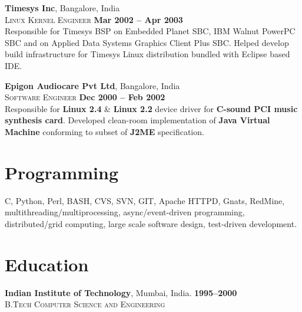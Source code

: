 \documentclass[margin,line]{resume}
\begin{document}
\begin{resume}
    \textbf{Timesys Inc}, Bangalore, India \\\vspace{1mm}%
    \textsc{Linux Kernel Engineer} \hfill \textbf{Mar 2002 -- Apr 2003}\\
    Responsible for Timesys BSP on Embedded Planet SBC, IBM Walnut
    PowerPC SBC and on Applied Data Systems Graphics Client Plus SBC.
    Helped develop build infrastructure for Timesys Linux distribution
    bundled with Eclipse based IDE.

    \textbf{Epigon Audiocare Pvt Ltd}, Bangalore, India \\\vspace{1mm}%
    \textsc{Software Engineer} \hfill \textbf{Dec 2000 -- Feb 2002}\\
    Responsible for {\bf Linux 2.4} \& {\bf Linux 2.2} device driver
    for {\bf C-sound PCI music synthesis card}. Developed clean-room
    implementation of {\bf Java Virtual Machine} conforming to subset
    of {\bf J2ME} specification.
    

    \section{\mysidestyle Programming} 

    C, Python, Perl, BASH, CVS, SVN, GIT, Apache HTTPD, Gnats,
    RedMine, multithreading/multiprocessing, async/event-driven
    programming, distributed/grid computing, large scale software
    design, test-driven development.


    \section{\mysidestyle Education}
	\textbf{Indian Institute of Technology}, Mumbai, India. \hfill \textbf{1995--2000}\\
	\textsc{B.Tech Computer Science and Engineering} \\


\end{resume}
\end{document}
